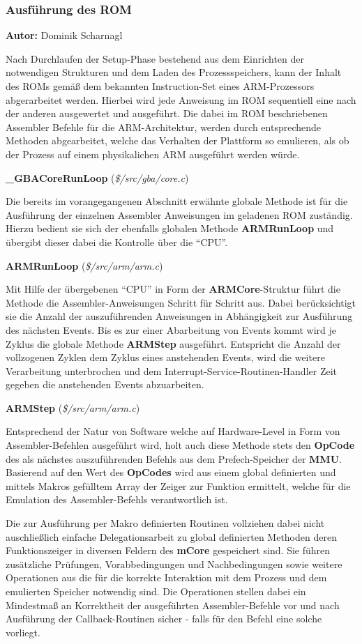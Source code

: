 \documentclass[11pt,a4paper]{scrartcl}
\newcommand{\AutorDominik} {
    \vspace{-4mm}
    \large \textbf{Autor:} Dominik Scharnagl \normalsize
    \vspace{2mm}
}
\newcommand{\paratitlecode}[2] {
    \vspace{5mm}
    \large \textbf{#1} \normalsize(\textit{\${#2}})
    \vspace{2mm}\newline
}
\begin{document}
\newpage
\subsubsection{Ausf\"uhrung des ROM}
\AutorDominik

Nach Durchlaufen der Setup-Phase bestehend aus dem Einrichten der notwendigen Strukturen und dem Laden des Prozessspeichers, kann der Inhalt des ROMs gem\"a{\ss} dem bekannten Instruction-Set eines ARM-Prozessors abgerarbeitet werden. Hierbei wird jede Anweisung im ROM sequentiell eine nach der anderen ausgewertet und ausgef\"uhrt. Die dabei im ROM beschriebenen Assembler Befehle f\"ur die ARM-Architektur, werden durch entsprechende Methoden abgearbeitet, welche das Verhalten der Plattform so emulieren, als ob der Prozess auf einem physikalichen ARM ausgef\"uhrt werden w\"urde.

\paratitlecode{{\_}GBACoreRunLoop}{/src/gba/core.c}
Die bereits im vorangegangenen Abschnitt erw\"ahnte globale Methode ist f\"ur die Ausf\"uhrung der einzelnen Assembler Anweisungen im geladenen ROM zust\"andig. Hierzu bedient sie sich der ebenfalls globalen Methode \textbf{ARMRunLoop} und \"ubergibt dieser dabei die Kontrolle \"uber die \enquote{CPU}.

\paratitlecode{ARMRunLoop}{/src/arm/arm.c}
Mit Hilfe der \"ubergebenen \enquote{CPU} in Form der \textbf{ARMCore}-Struktur f\"uhrt die Methode die Assembler-Anweisungen Schritt f\"ur Schritt aus. Dabei ber\"ucksichtigt sie die Anzahl der auszuf\"uhrenden Anweisungen in Abh\"angigkeit zur Ausf\"uhrung des n\"achsten Events. Bis es zur einer Abarbeitung von Events kommt wird je Zyklus die globale Methode \textbf{ARMStep} ausgef\"uhrt. Entspricht die Anzahl der vollzogenen Zyklen dem Zyklus eines anstehenden Events, wird die weitere Verarbeitung unterbrochen und dem Interrupt-Service-Routinen-Handler Zeit gegeben die anstehenden Events abzuarbeiten.

\paratitlecode{ARMStep}{/src/arm/arm.c}
Entsprechend der Natur von Software welche auf Hardware-Level in Form von Assembler-Befehlen ausgef\"uhrt wird, holt auch diese Methode stets den \textbf{OpCode} des als n\"achstes auszuf\"uhrenden Befehls aus dem Prefech-Speicher der \textbf{MMU}. Basierend auf den Wert des \textbf{OpCodes} wird aus einem global definierten und mittels Makros gef\"ulltem Array der Zeiger zur Funktion ermittelt, welche f\"ur die Emulation des Assembler-Befehls verantwortlich ist.

Die zur Ausf\"uhrung per Makro definierten Routinen vollziehen dabei nicht auschlie{\ss}lich einfache Delegationsarbeit zu global definierten Methoden deren Funktionszeiger in diversen Feldern des \textbf{mCore} gespeichert sind. Sie f\"uhren zus\"atzliche Pr\"ufungen, Vorabbedingungen und Nachbedingungen sowie weitere Operationen aus die f\"ur die korrekte Interaktion mit dem Prozess und dem emulierten Speicher notwendig sind. Die Operationen stellen dabei ein Mindestma{\ss} an Korrektheit der ausgef\"uhrten Assembler-Befehle vor und nach Ausf\"uhrung der Callback-Routinen sicher - falls f\"ur den Befehl eine solche vorliegt.
\end{document}
